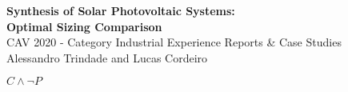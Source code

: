 \documentclass[12pt,a4paper]{article}
\begin{document}
\begin{center}
\textbf{Synthesis of Solar Photovoltaic Systems: \\ Optimal Sizing Comparison} \\

CAV 2020 -  Category Industrial Experience Reports \& Case Studies \\

Alessandro Trindade and Lucas Cordeiro \\
\end{center}

$C \wedge \neg P$

%
%
\end{document}
